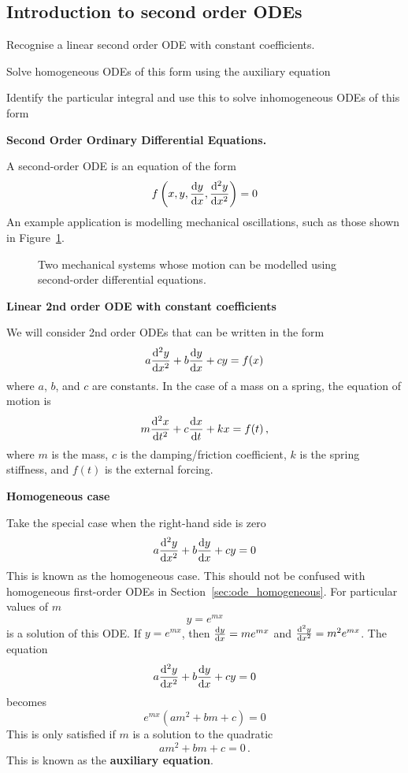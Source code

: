 
\newtexpage
\subsection{Introduction to second order ODEs}
\label{sec:ode_second}

\begin{learningoutcomes}
\item Recognise a linear second order ODE with constant coefficients.
\item Solve homogeneous ODEs of this form using the auxiliary equation
\item Identify the particular integral and use this to solve inhomogeneous ODEs of this form
\end{learningoutcomes}


\textbf{Second Order Ordinary Differential Equations.}

A second-order ODE is an equation of the form
\[
f\left(x,y,\frac{{\rm d} y}{{\rm d} x},\frac{{\rm d} ^2y}{{\rm d} x^2}\right)=0
\]
An example application is modelling mechanical oscillations, such as those shown in Figure~\ref{fig:ode_mechanics}.

\begin{figure}[!htb]
\centering
{}
\caption{Two mechanical systems whose motion can be modelled using second-order differential equations.}
\label{fig:ode_mechanics}
\end{figure}


\textbf{Linear 2nd order ODE with constant coefficients}

We will consider 2nd order ODEs that can be written in the form
\[
a\frac{{\rm d} ^2y}{{\rm d} x^2}+b\frac{{\rm d} y}{{\rm d} x}+cy=f(x)
\]
where $a$, $b$, and $c$ are constants. In the case of a mass on a spring, the equation of motion is
\[
m\frac{{\rm d} ^2x}{{\rm d} t^2}+c\frac{{\rm d} x}{{\rm d} t}+kx=f(t) \, ,
\]
where $m$ is the mass, $c$ is the damping/friction coefficient, $k$ is the spring stiffness, and $f(t)$ is the external forcing.


\textbf{Homogeneous case}

Take the special case when the right-hand side is zero
\[
a\frac{{\rm d} ^2y}{{\rm d} x^2}+b\frac{{\rm d} y}{{\rm d} x}+cy=0
\]
This is known as the homogeneous case. This should not be confused with homogeneous first-order ODEs in Section~\ref{sec:ode_homogeneous}. For particular values of $m$
\[
y={e}^{mx}
\]
is a solution of this ODE. If $y={e}^{mx}$, then $\frac{{\rm d} y}{{\rm d} x}=m{e}^{mx}$ and $\frac{{\rm d} ^2y}{{\rm d} x^2}={m}^{2}{e}^{mx}$. The equation
\[
a\frac{{\rm d} ^2y}{{\rm d} x^2}+b\frac{{\rm d} y}{{\rm d} x}+cy=0
\]
becomes
\[
{e}^{mx}\left(a{m}^{2}+bm+c\right)=0
\]
This is only satisfied if $m$ is a solution to the quadratic
\[
a{m}^{2}+bm+c=0 \, .
\]
This is known as the \textbf{auxiliary equation}.

